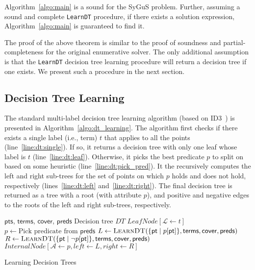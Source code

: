 \documentclass{llncs}
\newcommand\Points{\mathsf{pts}}
\newcommand\Point{\mathsf{pt}}
\newcommand\Predicates{\mathsf{preds}}
\newcommand\Pred{p}
\newcommand\Terms{\mathsf{terms}}
\newcommand\Term{t}
\newcommand\Cover{\mathsf{cover}}
\newcommand\DecisionTree{\mathit{DT}}
\newcommand\Attribute{\mathcal{A}}
\newcommand\Label{\mathcal{L}}
\newcommand{\sygus}{{\sffamily\fontsize{8.5}{10}\selectfont
    SyGuS}\xspace}
\begin{document}
\begin{theorem}
  Algorithm~\ref{algo:main} is a sound for the \sygus problem.
  Further, assuming a sound and complete {\tt LearnDT} procedure, if
  there exists a solution expression, Algorithm~\ref{algo:main} is
  guaranteed to find it.
\end{theorem}
The proof of the above theorem is similar to the proof of soundness and
partial-completeness for the original enumerative solver.
The only additional assumption is that the {\tt LearnDT} decision tree
learning procedure will return a decision tree if one exists.
We present such a procedure in the next section.


\subsection{Decision Tree Learning}
\label{sec:decision_trees}

The standard multi-label decision tree learning algorithm (based on
ID3~\cite{quinlan-86}) is presented in Algorithm~\ref{algo:dt_learning}.
The algorithm first checks if there exists a single label (i.e., term)
$\Term$ that applies to all the points (line~\ref{line:dt:single}).
If so, it returns a decision tree with only one leaf whose label is
$\Term$ (line~\ref{line:dt:leaf}).
Otherwise, it picks the best predicate $\Pred$ to split on based on some
heuristic (line~\ref{line:dt:pick_pred}).
It the recursively computes the left and right sub-trees for the set of
points on which $\Pred$ holds and does not hold, respectively
(lines~\ref{line:dt:left} and~\ref{line:dt:right}).
The final decision tree is returned as a tree with a root (with
attribute $\Pred$), and positive and negative edges to the roots of the
left and right sub-trees, respectively.

\begin{algorithm}
  \begin{algorithmic}[1]
    \fontsize{8}{10}\selectfont
    \Require $\Points$, $\Terms$, $\Cover$, $\Predicates$
    \Ensure Decision tree $\DecisionTree$
    \If { $\exists \Term : \Points \subseteq \Cover[\Term]$ }\label{line:dt:single}
    \Return $\mathit{LeafNode}[\Label \gets \Term]$ \label{line:dt:leaf}
    \EndIf
    \State $\Pred \gets \mbox{Pick predicate from $\Predicates$}$\label{line:dt:pick_pred}
    \State $L \gets \Call{LearnDT}{\{ \Point \mid \Pred[\Point] \},
      \Terms, \Cover, \Predicates }$\label{line:dt:left}
    \State $R \gets \Call{LearnDT}{\{ \Point \mid \neg \Pred[\Point]
      \}, \Terms, \Cover, \Predicates }$\label{line:dt:right}
    \State \Return $\mathit{InternalNode}[\Attribute \gets \Pred,  \mathit{left} \gets L , \mathit{right} \gets R ]$
  \end{algorithmic}
  \caption{Learning Decision Trees}
  \label{algo:dt_learning}
\end{algorithm}
\end{document}
